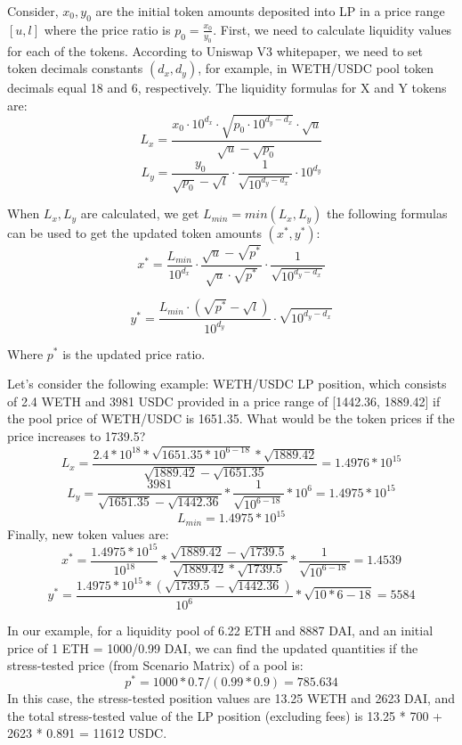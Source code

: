 \documentclass[conference]{IEEEtran}
\begin{document}
Consider, $x_{0}, y_{0}$ are the initial token amounts deposited into LP in a price range $[u,l]$ where the price ratio is $p_{0}=\frac{x_{0}}{y_{0}}$. First, we need to calculate liquidity values for each of the tokens. According to Uniswap V3 whitepaper, we need to set token decimals constants $(d_{x}, d_{y})$, for example, in WETH/USDC pool token decimals equal 18 and 6, respectively. The liquidity formulas for X and Y tokens are: $$L_{x} = \frac{x_{0} \cdot 10^{d_{x}} \cdot 
\sqrt{p_{0} \cdot 10^{d_{y} - d_{x}}} 
\cdot \sqrt{u}}{\sqrt{u} - \sqrt{p_{0}}}$$ 
$$L_{y} = \frac{y_{0}}{\sqrt{p_{0}} - \sqrt{l}}
\cdot \frac{1}{\sqrt{10^{{d_{y}} - {d_{x}}}}}
\cdot 10^{d_{y}}$$

When $L_{x}, L_{y}$ are calculated, we get $L_{min} = min(L_{x}, L_{y})$ the following formulas can be used to get the updated token amounts $(x^{*}, y^{*})$:
$$x^{*} = \frac{L_{min}}{10^{d_{x}}}
\cdot \frac{\sqrt{u} - \sqrt{p^{*}}}{\sqrt{u} \cdot \sqrt{p^{*}}}
\cdot \frac{1}{\sqrt{10^{d_{y} - d_{x}}}}$$

$$y^{*} = \frac{L_{min} \cdot (\sqrt{p^{*}} - \sqrt{l})}{10^{d_{y}}}
\cdot \sqrt{10^{d_{y} - d_{x}}}$$

Where $p^{*}$ is the updated price ratio. 

Let's consider the following example: WETH/USDC LP position, which consists of 2.4 WETH and 3981 USDC provided in a price range of [1442.36, 1889.42] if the pool price of WETH/USDC is 1651.35. What would be the token prices if the price increases to 1739.5?
$$L_{x} = \frac{2.4*10^{18}*\sqrt{1651.35*10^{6-18}}*\sqrt{1889.42}}{\sqrt{1889.42} - \sqrt{1651.35}}=1.4976*10^{15}$$
$$L_{y} = \frac{3981}{\sqrt{1651.35}-\sqrt{1442.36}}*\frac{1}{\sqrt{10^{6-18}}}*10^{6}=1.4975*10^{15}$$
$$L_{min}=1.4975*10^{15}$$
Finally, new token values are:
$$x^{*} = \frac{1.4975*10^{15}}{10^{18}}*\frac{\sqrt{1889.42} - \sqrt{1739.5}}{\sqrt{1889.42} * \sqrt{1739.5}}*\frac{1}{\sqrt{10^{6-18}}}=1.4539$$
$$y^{*} = \frac{1.4975*10^{15}*(\sqrt{1739.5}-\sqrt{1442.36})}{10^{6}}*\sqrt{10*{6-18}}=5584$$

In our example, for a liquidity pool of 6.22 ETH and 8887 DAI, and an initial price of 1 ETH = 1000/0.99 DAI, we can find the updated quantities if the stress-tested price (from Scenario Matrix) of a pool is: $$p^{*} = 1000*0.7/(0.99*0.9) = 785.634$$
In this case, the stress-tested position values are 13.25 WETH and 2623 DAI, and the total stress-tested value of the LP position (excluding fees) is 13.25 * 700 + 2623 * 0.891 = 11612 USDC.
\end{document}

